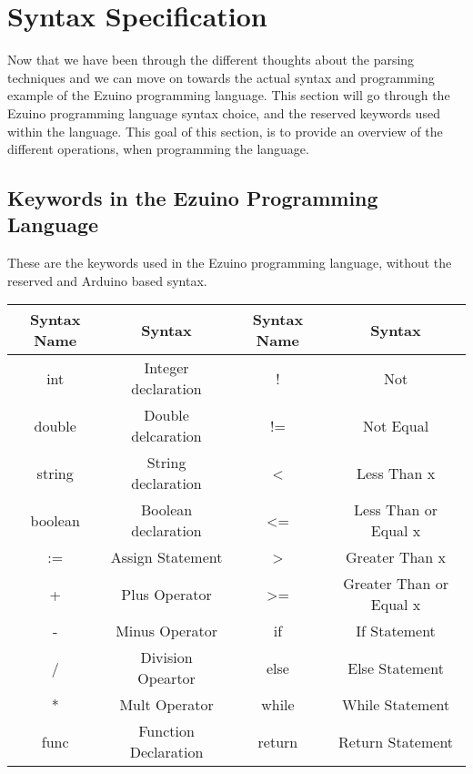 \section{Syntax Specification}
Now that we have been through the different thoughts about the parsing techniques and we can move on towards the actual syntax and programming example of the Ezuino programming language.
This section will go through the Ezuino programming language syntax choice, and the reserved keywords used within the language. This goal of this section, is to provide an overview of the different operations, when programming the language. 
\subsection{Keywords in the Ezuino Programming Language}
These are the keywords used in the Ezuino programming language, without the reserved and Arduino based syntax.
\begin{table}[H]
\begin{tabular}{|c|c|c|c|}
\hline
\textbf{Syntax Name} & \textbf{Syntax}      & \textbf{Syntax Name} & \textbf{Syntax}         \\ \hline
int                  & Integer declaration  & !                    & Not                     \\ \hline
double               & Double delcaration   & !=                   & Not Equal               \\ \hline
string               & String declaration   & \textless{}          & Less Than x             \\ \hline
boolean              & Boolean declaration  & \textless{}=         & Less Than or Equal x    \\ \hline
:=                   & Assign Statement     & \textgreater{}       & Greater Than x          \\ \hline
+                    & Plus Operator        & \textgreater{}=      & Greater Than or Equal x \\ \hline
-                    & Minus Operator       & if                   & If Statement            \\ \hline
/                    & Division Opeartor    & else                 & Else Statement          \\ \hline
*                    & Mult Operator        & while                & While Statement         \\ \hline
func                 & Function Declaration & return               & Return Statement        \\ \hline
\end{tabular}
\end{table}
